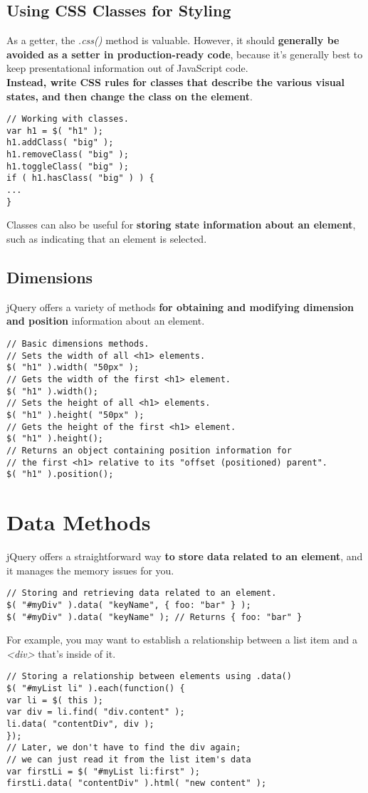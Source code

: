 \documentclass[10pt,letterpaper]{report}
\begin{document}
\subsection{Using CSS Classes for Styling}
As a getter, the \textit{.css()} method is valuable. However, it should \textbf{generally be avoided as a setter in production-ready code}, because it's generally best to keep presentational information out of JavaScript code.\\
\textbf{Instead, write CSS rules for classes that describe the various visual states, and then change the class on the element}.
\begin{lstlisting}
// Working with classes.
var h1 = $( "h1" );
h1.addClass( "big" );
h1.removeClass( "big" );
h1.toggleClass( "big" );
if ( h1.hasClass( "big" ) ) {
...
}
\end{lstlisting}
Classes can also be useful for \textbf{storing state information about an element}, such as indicating that an element is selected.
\subsection{Dimensions}
jQuery offers a variety of methods \textbf{for obtaining and modifying dimension and position} information about an element.
\begin{lstlisting}
// Basic dimensions methods.
// Sets the width of all <h1> elements.
$( "h1" ).width( "50px" );
// Gets the width of the first <h1> element.
$( "h1" ).width();
// Sets the height of all <h1> elements.
$( "h1" ).height( "50px" );
// Gets the height of the first <h1> element.
$( "h1" ).height();
// Returns an object containing position information for
// the first <h1> relative to its "offset (positioned) parent".
$( "h1" ).position();
\end{lstlisting}
\section{Data Methods}
 jQuery offers a straightforward way \textbf{to store data related to an element}, and it manages the memory issues for you.
\begin{lstlisting}
// Storing and retrieving data related to an element.
$( "#myDiv" ).data( "keyName", { foo: "bar" } );
$( "#myDiv" ).data( "keyName" ); // Returns { foo: "bar" }
\end{lstlisting}
For example, you may want to establish a relationship between a list item and a \textit{<div>} that's inside of it.
\begin{lstlisting}
// Storing a relationship between elements using .data()
$( "#myList li" ).each(function() {
var li = $( this );
var div = li.find( "div.content" );
li.data( "contentDiv", div );
});
// Later, we don't have to find the div again;
// we can just read it from the list item's data
var firstLi = $( "#myList li:first" );
firstLi.data( "contentDiv" ).html( "new content" );
\end{lstlisting}
\end{document}
